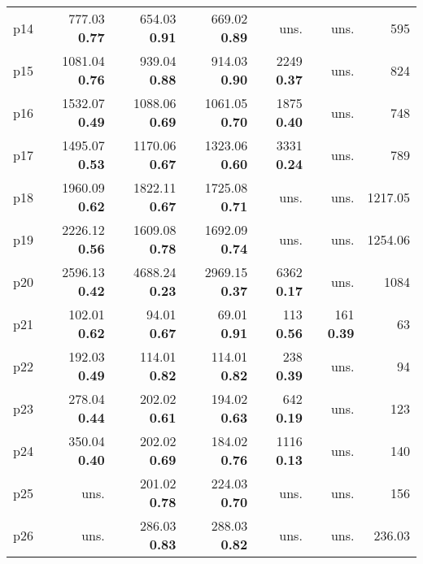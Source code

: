 \begin{tabular}{|l|rrrrr|r|}
p14 & {\footnotesize 777.03} \textbf{0.77} & {\footnotesize 654.03} \textbf{0.91} & {\footnotesize 669.02} \textbf{0.89} & uns. & uns. & 595\\
p15 & {\footnotesize 1081.04} \textbf{0.76} & {\footnotesize 939.04} \textbf{0.88} & {\footnotesize 914.03} \textbf{0.90} & {\footnotesize 2249} \textbf{0.37} & uns. & 824\\
p16 & {\footnotesize 1532.07} \textbf{0.49} & {\footnotesize 1088.06} \textbf{0.69} & {\footnotesize 1061.05} \textbf{0.70} & {\footnotesize 1875} \textbf{0.40} & uns. & 748\\
p17 & {\footnotesize 1495.07} \textbf{0.53} & {\footnotesize 1170.06} \textbf{0.67} & {\footnotesize 1323.06} \textbf{0.60} & {\footnotesize 3331} \textbf{0.24} & uns. & 789\\
p18 & {\footnotesize 1960.09} \textbf{0.62} & {\footnotesize 1822.11} \textbf{0.67} & {\footnotesize 1725.08} \textbf{0.71} & uns. & uns. & 1217.05\\
p19 & {\footnotesize 2226.12} \textbf{0.56} & {\footnotesize 1609.08} \textbf{0.78} & {\footnotesize 1692.09} \textbf{0.74} & uns. & uns. & 1254.06\\
p20 & {\footnotesize 2596.13} \textbf{0.42} & {\footnotesize 4688.24} \textbf{0.23} & {\footnotesize 2969.15} \textbf{0.37} & {\footnotesize 6362} \textbf{0.17} & uns. & 1084\\
p21 & {\footnotesize 102.01} \textbf{0.62} & {\footnotesize 94.01} \textbf{0.67} & {\footnotesize 69.01} \textbf{0.91} & {\footnotesize 113} \textbf{0.56} & {\footnotesize 161} \textbf{0.39} & 63\\
p22 & {\footnotesize 192.03} \textbf{0.49} & {\footnotesize 114.01} \textbf{0.82} & {\footnotesize 114.01} \textbf{0.82} & {\footnotesize 238} \textbf{0.39} & uns. & 94\\
p23 & {\footnotesize 278.04} \textbf{0.44} & {\footnotesize 202.02} \textbf{0.61} & {\footnotesize 194.02} \textbf{0.63} & {\footnotesize 642} \textbf{0.19} & uns. & 123\\
p24 & {\footnotesize 350.04} \textbf{0.40} & {\footnotesize 202.02} \textbf{0.69} & {\footnotesize 184.02} \textbf{0.76} & {\footnotesize 1116} \textbf{0.13} & uns. & 140\\
p25 & uns. & {\footnotesize 201.02} \textbf{0.78} & {\footnotesize 224.03} \textbf{0.70} & uns. & uns. & 156\\
p26 & uns. & {\footnotesize 286.03} \textbf{0.83} & {\footnotesize 288.03} \textbf{0.82} & uns. & uns. & 236.03\\

\end{tabular}

